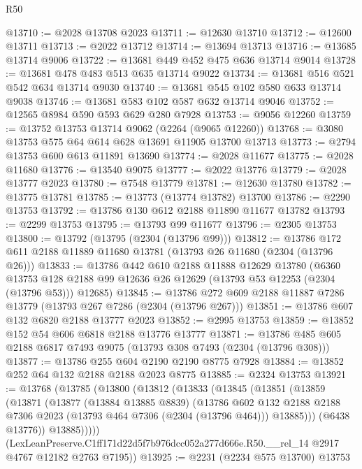 \begin{lexlean}{R50}
\begin{coremodule}
@13710 := @2028 @13708 @2023
@13711 := @12630 @13710
@13712 := @12600 @13711
@13713 := @2022 @13712
@13714 := @13694 @13713
@13716 := @13685 @13714 @9006
@13722 := @13681 @449 @452 @475 @636 @13714 @9014
@13728 := @13681 @478 @483 @513 @635 @13714 @9022
@13734 := @13681 @516 @521 @542 @634 @13714 @9030
@13740 := @13681 @545 @102 @580 @633 @13714 @9038
@13746 := @13681 @583 @102 @587 @632 @13714 @9046
@13752 := @12565 @8984 @590 @593 @629 @280 @7928
@13753 := @9056 @12260
@13759 := @13752 @13753 @13714 @9062 (@2264 (@9065 @12260))
@13768 := @3080 @13753 @575 @64 @614 @628 @13691 @11905 @13700 @13713
@13773 := @2794 @13753 @600 @613 @11891 @13690
@13774 := @2028 @11677
@13775 := @2028 @11680
@13776 := @13540 @9075
@13777 := @2022 @13776
@13779 := @2028 @13777 @2023
@13780 := @7548 @13779
@13781 := @12630 @13780
@13782 := @13775 @13781
@13785 := @13773 (@13774 @13782) @13700
@13786 := @2290 @13753
@13792 := @13786 @130 @612 @2188 @11890 @11677 @13782
@13793 := @2299 @13753
@13795 := @13793 @99 @11677
@13796 := @2305 @13753
@13800 := @13792 (@13795 (@2304 (@13796 @99)))
@13812 := @13786 @172 @611 @2188 @11889 @11680 @13781 (@13793 @26 @11680 (@2304 (@13796 @26)))
@13833 := @13786
    @442
    @610
    @2188
    @11888
    @12629
    @13780
    (@6360 @13753 @128 @2188 @99 @12636 @26 @12629 (@13793 @53 @12253 (@2304 (@13796 @53))) @12685)
@13845 := @13786 @272 @609 @2188 @11887 @7286 @13779 (@13793 @267 @7286 (@2304 (@13796 @267)))
@13851 := @13786 @607 @132 @6820 @2188 @13777 @2023
@13852 := @2995 @13753
@13859 := @13852 @152 @54 @606 @6818 @2188 @13776 @13777
@13871 := @13786 @485 @605 @2188 @6817 @7493 @9075 (@13793 @308 @7493 (@2304 (@13796 @308)))
@13877 := @13786 @255 @604 @2190 @2190 @8775 @7928
@13884 := @13852 @252 @64 @132 @2188 @2188 @2023 @8775
@13885 := @2324 @13753
@13921 := @13768
    (@13785
      (@13800
        (@13812
          (@13833
            (@13845
              (@13851
                (@13859
                  (@13871
                    (@13877
                      (@13884 @13885 @8839)
                      (@13786
                        @602
                        @132
                        @2188
                        @2188
                        @7306
                        @2023
                        (@13793 @464 @7306 (@2304 (@13796 @464)))
                        @13885)))
                  (@6438 @13776))
                @13885)))))
      (LexLeanPreserve.C1ff171d22d5f7b976dcc052a277d666e.R50.__rel_14
        @2917
        @4767
        @12182
        @2763
        @7195))
@13925 := @2231 (@2234 @575 @13700) @13753

\end{coremodule}
\end{lexlean}
